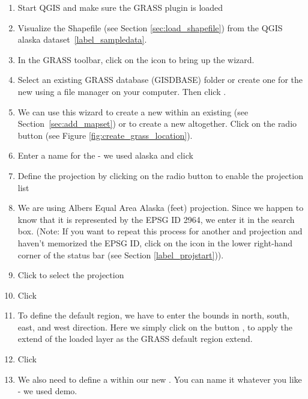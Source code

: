 \begin{enumerate}
  \item Start QGIS and make sure the GRASS plugin is loaded
  \item Visualize the  Shapefile (see Section
  \ref{sec:load_shapefile}) from the QGIS alaska dataset~\ref{label_sampledata}.
  \item In the GRASS toolbar, click on the  icon to bring up the  wizard.
  \item Select an existing GRASS database (GISDBASE) folder
   or create one for the new  using a
  file manager on your computer. Then click .
  \item We can use this wizard to create a new  within an
  existing  (see Section~\ref{sec:add_mapset}) or to create
  a new  altogether. Click on the radio button
   (see Figure \ref{fig:create_grass_location}).
  \item Enter a name for the  - we used alaska and click
  \item Define the projection by clicking on the radio button
   to enable the projection list
  \item We are using Albers Equal Area Alaska (feet) projection. Since we
  happen to know that it is represented by the EPSG ID 2964, we enter it in
  the search box. (Note: If you want to repeat this process for another
   and projection and haven't memorized the EPSG ID,
  click on the
   icon in the lower right-hand
  corner of the status bar (see Section \ref{label_projstart})).
  \item Click  to select the projection
  \item Click 
  \item To define the default region, we have to enter the 
  bounds in north, south, east, and west direction. Here we simply click on
  the button , to apply the extend of the
  loaded layer  as the GRASS default region extend.
  \item Click 
  \item We also need to define a  within our new
  . You can name it whatever you like - we used demo.

\end{enumerate}
